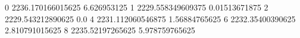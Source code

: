0 2236.170166015625 6.626953125
1 2229.558349609375 0.01513671875
2 2229.543212890625 0.0
4 2231.112060546875 1.56884765625
6 2232.35400390625 2.810791015625
8 2235.52197265625 5.978759765625
